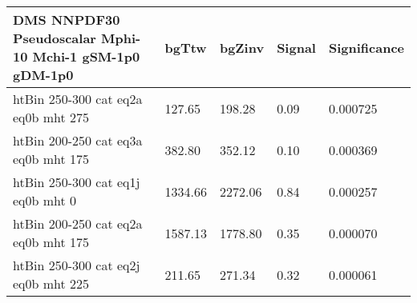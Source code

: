 \begin{tabular}{|l|l|l|l|l|}
\small
  \label{mostSensitiveBins_DMS_NNPDF30_Pseudoscalar_Mphi-10_Mchi-1_gSM-1p0_gDM-1p0_25ns}
	\textbf{DMS NNPDF30 Pseudoscalar Mphi-10 Mchi-1 gSM-1p0 gDM-1p0}	 & 	bgTtw	 & 	bgZinv	 & 	Signal &	 Significance \\ 
	\hline
	htBin 250-300 cat eq2a eq0b mht 275 & 	127.65	 & 	198.28	 & 	0.09 	&0.000725 \\ 
	htBin 200-250 cat eq3a eq0b mht 175 & 	382.80	 & 	352.12	 & 	0.10 	&0.000369 \\ 
	htBin 250-300 cat eq1j eq0b mht 0 & 	1334.66	 & 	2272.06	 & 	0.84 	&0.000257 \\ 
	htBin 200-250 cat eq2a eq0b mht 175 & 	1587.13	 & 	1778.80	 & 	0.35 	&0.000070 \\ 
	htBin 250-300 cat eq2j eq0b mht 225 & 	211.65	 & 	271.34	 & 	0.32 	&0.000061 \\ 
\end{tabular}
